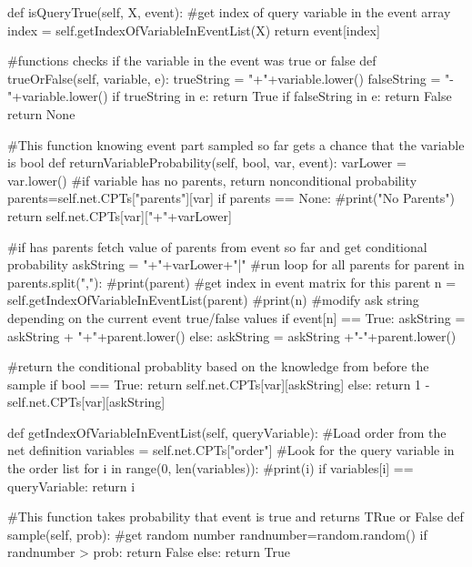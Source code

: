 \documentclass[10pt]{article}
\begin{document}
\begin{spverbatim}
    def isQueryTrue(self, X,  event):
        #get index of query variable in the event array
        index = self.getIndexOfVariableInEventList(X)
        return event[index]
    
    #functions checks if the variable in the event was true or false
    def trueOrFalse(self,  variable,  e):
        trueString = "+"+variable.lower()
        falseString = "-"+variable.lower()
        if trueString in e:
            return True
        if falseString in e:
            return False
        return None
    
    #This function knowing event part sampled so far gets a chance that the variable is bool
    def returnVariableProbability(self, bool,  var, event):
        varLower = var.lower()
        #if variable has no parents, return nonconditional probability
        parents=self.net.CPTs["parents"][var]
        if parents == None:
            #print("No Parents")
            return self.net.CPTs[var]["+"+varLower]
        
        #if has parents fetch value of parents from event so far and get conditional probability
        askString = "+"+varLower+"|"
        #run loop for all parents
        for parent in parents.split(","):
            #print(parent)
            #get index in event matrix for this parent
            n = self.getIndexOfVariableInEventList(parent)
            #print(n)
            #modify ask string depending on the current event true/false values
            if event[n] == True:
                askString = askString + "+"+parent.lower()
            else:
                askString = askString +"-"+parent.lower()
        
        #return the conditional probablity based on the knowledge from before the sample
        if bool == True:
            return self.net.CPTs[var][askString]
        else:
            return 1 - self.net.CPTs[var][askString]
     
  
    
    def getIndexOfVariableInEventList(self,  queryVariable):
        #Load order from the net definition
        variables = self.net.CPTs["order"]
        #Look for the query variable in the order list
        for i in range(0,  len(variables)):
            #print(i)
            if variables[i] == queryVariable:
                return i 
    
    #This function takes probability that event is true and returns TRue or False
    def sample(self, prob):
        #get random number
        randnumber=random.random()
        if randnumber > prob:
            return False
        else:
            return True
    

\end{spverbatim}
\end{document}
